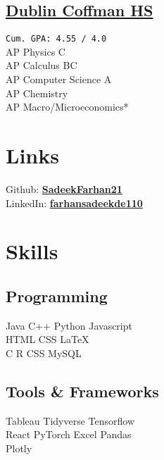 \documentclass[]{Farhan_Resume_Class}
\begin{document}
\begin{minipage}[t]{0.25\textwidth}
    \sectionsep
    \subsection{\href{https://www.dublinschools.net/Coffman}{Dublin Coffman HS}}
    \texttt{Cum. GPA: 4.55 / 4.0} \\
    AP Physics C \\
    AP Calculus BC \\
    AP Computer Science A\\
    AP Chemistry\\
    AP Macro/Microeconomics*\\


    
\sectionsep    
\section{Links}
Github: \href{https://github.com/SadeekFarhan21}{\bf SadeekFarhan21} \\
LinkedIn:  \href{https://www.linkedin.com/in/farhansadeekde110/}{\bf farhansadeekde110} \\


    \section{Skills}
    \subsection{Programming}
    Java \textbullet{}   C++ \textbullet{} Python \textbullet{} Javascript \\
    HTML \textbullet{} CSS \textbullet \LaTeX \\
    C \textbullet{} R \textbullet{} CSS \textbullet{} \textbullet{} MySQL \\
    \vspace{1em}
    \subsection{Tools \& Frameworks}
    Tableau \textbullet{} Tidyverse \textbullet{} Tensorflow \\ React \textbullet{}
    PyTorch \textbullet{} Excel \textbullet{} Pandas\\ Plotly


\end{minipage}
\end{document}
